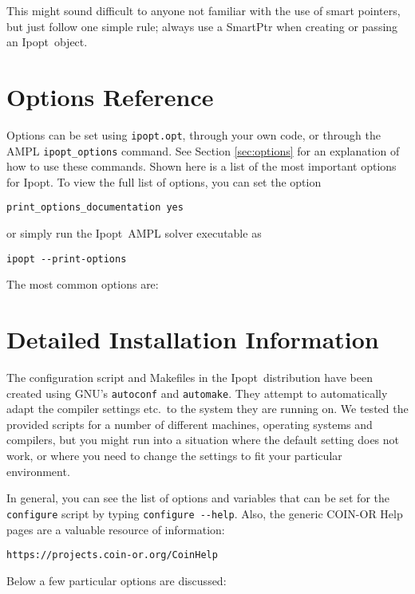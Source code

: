 \documentclass[10pt]{article}
\newcommand{\Ipopt}{{\sc Ipopt}}
\begin{document}
This might sound difficult to anyone not familiar with the use of
smart pointers, but just follow one simple rule; always use a SmartPtr
when creating or passing an \Ipopt\ object.

\newpage
\section{Options Reference} \label{app.options_ref}

Options can be set using {\tt ipopt.opt}, through your own code, or
through the AMPL {\tt ipopt\_options} command. See Section
\ref{sec:options} for an explanation of how to use these commands.
Shown here is a list of the most important options for Ipopt. To view
the full list of options, you can set the option 
\begin{verbatim}
print_options_documentation yes
\end{verbatim}
or simply run the \Ipopt\ AMPL solver executable as
\begin{verbatim}
ipopt --print-options
\end{verbatim}


The most common options are:



\newpage
\section{Detailed Installation Information}\label{ExpertInstall}

The configuration script and Makefiles in the \Ipopt\ distribution
have been created using GNU's {\tt autoconf} and {\tt automake}.  They
attempt to automatically adapt the compiler settings etc.\ to the
system they are running on.  We tested the provided scripts for a
number of different machines, operating systems and compilers, but you
might run into a situation where the default setting does not work, or
where you need to change the settings to fit your particular
environment.

In general, you can see the list of options and variables that can be
set for the {\tt configure} script by typing \verb/configure --help/.
Also, the generic COIN-OR Help pages are a valuable resource of
information:

\centerline{\tt https://projects.coin-or.org/CoinHelp}

Below a few particular options are discussed:
\end{document}
